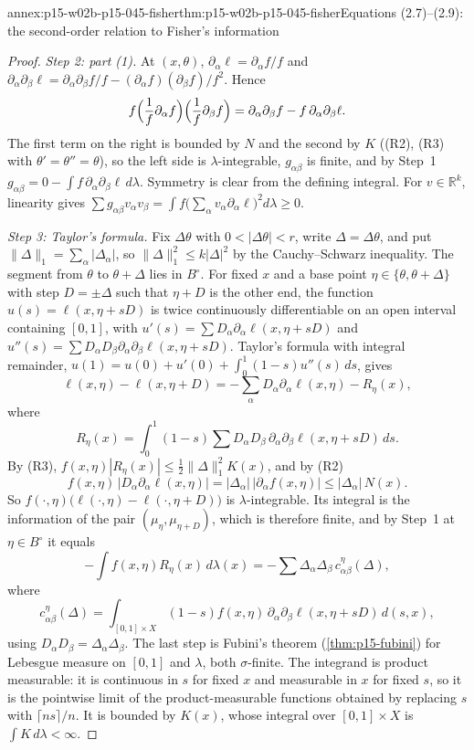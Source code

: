 \begin{annexitem}{annex:p15-w02b-p15-045-fisher}{thm:p15-w02b-p15-045-fisher}{Equations (2.7)--(2.9): the second-order relation to Fisher's information}
\begin{proof}
\emph{Step 2: part (1).} At \((x,\theta)\),
\(\partial_\alpha\ell=\partial_\alpha f/f\) and
\(\partial_\alpha\partial_\beta\ell=\partial_\alpha\partial_\beta f/f-(\partial_\alpha f)(\partial_\beta f)/f^2\).
Hence
\[
  f\Bigl(\frac1f\partial_\alpha f\Bigr)\Bigl(\frac1f\partial_\beta f\Bigr)
  =\partial_\alpha\partial_\beta f-f\,\partial_\alpha\partial_\beta\ell .
\]
The first term on the right is bounded by \(N\) and the second by \(K\)
((R2), (R3) with \(\theta'=\theta''=\theta\)), so the left side is
\(\lambda\)-integrable, \(g_{\alpha\beta}\) is finite, and by Step~1
\(g_{\alpha\beta}=0-\int f\,\partial_\alpha\partial_\beta\ell\,d\lambda\).
Symmetry is clear from the defining integral. For \(v\in\mathbb R^k\),
linearity gives
\(\sum g_{\alpha\beta}v_\alpha v_\beta=\int f\bigl(\sum_\alpha v_\alpha\partial_\alpha\ell\bigr)^2d\lambda\geq0\).

\emph{Step 3: Taylor's formula.} Fix \(\Delta\theta\) with
\(0<|\Delta\theta|<r\), write \(\Delta=\Delta\theta\), and put
\(\|\Delta\|_1=\sum_\alpha|\Delta_\alpha|\), so
\(\|\Delta\|_1^2\leq k|\Delta|^2\) by the Cauchy--Schwarz inequality.
The segment from \(\theta\) to \(\theta+\Delta\) lies in \(B^\circ\).
For fixed \(x\) and a base point \(\eta\in\{\theta,\theta+\Delta\}\)
with step \(D=\pm\Delta\) such that \(\eta+D\) is the other end, the
function \(u(s)=\ell(x,\eta+sD)\) is twice continuously differentiable
on an open interval containing \([0,1]\), with
\(u'(s)=\sum D_\alpha\partial_\alpha\ell(x,\eta+sD)\) and
\(u''(s)=\sum D_\alpha D_\beta\partial_\alpha\partial_\beta\ell(x,\eta+sD)\).
Taylor's formula with integral remainder,
\(u(1)=u(0)+u'(0)+\int_0^1(1-s)u''(s)\,ds\), gives
\[
  \ell(x,\eta)-\ell(x,\eta+D)=-\sum_\alpha D_\alpha\partial_\alpha\ell(x,\eta)-R_{\eta}(x),
\]
where
\[
  R_\eta(x)=\int_0^1(1-s)\sum D_\alpha D_\beta\,\partial_\alpha\partial_\beta\ell(x,\eta+sD)\,ds .
\]
By (R3), \(f(x,\eta)|R_\eta(x)|\leq\tfrac12\|\Delta\|_1^2K(x)\), and by
(R2)
\[
  f(x,\eta)\,|D_\alpha\partial_\alpha\ell(x,\eta)|=|\Delta_\alpha|\,|\partial_\alpha f(x,\eta)|\leq|\Delta_\alpha|\,N(x).
\] So \(f(\cdot,\eta)\bigl(\ell(\cdot,\eta)-\ell(\cdot,\eta+D)\bigr)\)
is \(\lambda\)-integrable. Its integral is the information of the pair
\((\mu_\eta,\mu_{\eta+D})\), which is therefore finite, and by Step~1 at
\(\eta\in B^\circ\) it equals
\[
  -\int f(x,\eta)R_\eta(x)\,d\lambda(x)
  =-\sum\Delta_\alpha\Delta_\beta\,c^{\eta}_{\alpha\beta}(\Delta),
\]
where
\[
  c^{\eta}_{\alpha\beta}(\Delta)=\int_{[0,1]\times X}(1-s)f(x,\eta)\,\partial_\alpha\partial_\beta\ell(x,\eta+sD)\,d(s,x),
\]
using \(D_\alpha D_\beta=\Delta_\alpha\Delta_\beta\). The last step is
Fubini's theorem (\cref{thm:p15-fubini}) for Lebesgue measure on
\([0,1]\) and \(\lambda\), both \(\sigma\)-finite. The integrand is
product measurable: it is continuous in \(s\) for fixed \(x\) and
measurable in \(x\) for fixed \(s\), so it is the pointwise limit of
the product-measurable functions obtained by replacing \(s\) with
\(\lceil ns\rceil/n\). It is bounded by \(K(x)\), whose integral over
\([0,1]\times X\) is \(\int K\,d\lambda<\infty\).


\end{proof}
\end{annexitem}
